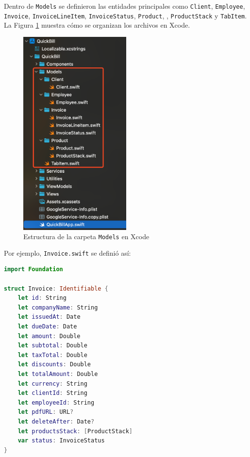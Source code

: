 \begin{large}

Dentro de \texttt{Models} se definieron las entidades principales como \texttt{Client}, \texttt{Employee}, \texttt{Invoice}, \texttt{InvoiceLineItem}, \texttt{InvoiceStatus}, \texttt{Product}, , \texttt{ProductStack} y \texttt{TabItem}. La Figura \ref{fig:models_folder} muestra cómo se organizan los archivos en Xcode.

\begin{figure}[h]
\centering
\includegraphics[width=0.5\textwidth]{Ilustraciones/ios_models_folder.png}
\caption{Estructura de la carpeta \texttt{Models} en Xcode}
\label{fig:models_folder}
\end{figure}

Por ejemplo, \texttt{Invoice.swift} se definió así:

\begin{lstlisting}[language={swift}, caption={Definición de \texttt{Invoice.swift}}]
import Foundation

struct Invoice: Identifiable {
    let id: String
    let companyName: String
    let issuedAt: Date
    let dueDate: Date
    let amount: Double
    let subtotal: Double
    let taxTotal: Double
    let discounts: Double
    let totalAmount: Double
    let currency: String
    let clientId: String
    let employeeId: String
    let pdfURL: URL?
    let deleteAfter: Date?
    let productsStack: [ProductStack]
    var status: InvoiceStatus
}
\end{lstlisting}

\end{large}

